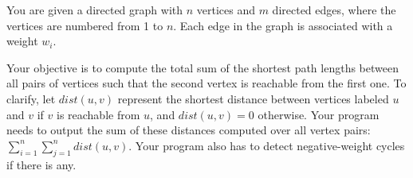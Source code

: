 You are given a directed graph with $n$ vertices and $m$ directed edges, where the vertices are numbered from 1 to $n$. Each edge in the graph is associated with a weight $w_i$.

Your objective is to compute the total sum of the shortest path lengths between all pairs of vertices such that the second vertex is reachable from the first one.
To clarify, let $dist(u, v)$ represent the shortest distance between vertices labeled $u$ and $v$ if $v$ is reachable from $u$, and $dist(u, v) = 0$ otherwise. Your program needs to output the sum of these distances computed over all vertex pairs: $\sum_{i=1}^{n} \sum_{j=1}^{n} dist(u, v)$.
Your program also has to detect negative-weight cycles if there is any.
